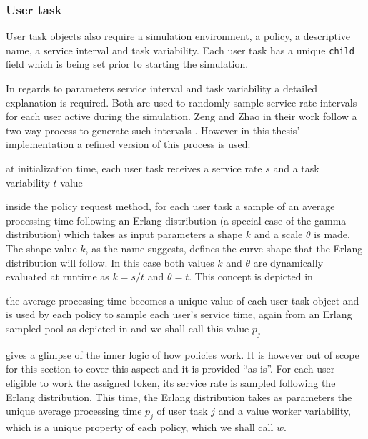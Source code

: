 \documentclass{seal_thesis}
\begin{document}
\subsubsection{User task}
\label{subsec:user_task}

User task objects also require a simulation environment, a policy, a descriptive name, a service interval and task variability. Each user task has a unique \texttt{child} field which is being set prior to starting the simulation.

In regards to parameters service interval and task variability a detailed explanation is required. Both are used to randomly sample service rate intervals for each user active during the simulation. Zeng and Zhao in their work follow a two way process to generate such intervals \cite[p. 8]{Zeng2005}. However in this thesis' implementation a refined version of this process is used:
\begin{enumerate*}
	\item at initialization time, each user task receives a service rate $s$ and a task variability $t$ value
	\item inside the policy request method, for each user task a sample of an average processing time following an Erlang distribution (a special case of the gamma distribution) which takes as input parameters a shape $k$ and a scale $\theta$ is made. The shape value $k$, as the name suggests, defines the curve shape that the Erlang distribution will follow. In this case both values $k$ and $\theta$ are dynamically evaluated at runtime as $k=s/t$ and $\theta = t$. This concept is depicted in 
	\item the average processing time becomes a unique value of each user task object and is used by each policy to sample each user's service time, again from an Erlang sampled pool as depicted in  and we shall call this value $p_j$
\end{enumerate*}

 gives a glimpse of the inner logic of how policies work. It is however out of scope for this section to cover this aspect and it is provided ``as is''. For each user eligible to work the assigned token, its service rate is sampled following the Erlang distribution. This time, the Erlang distribution takes as parameters the unique average processing time $p_j$ of user task $j$ and a value worker variability, which is a unique property of each policy, which we shall call $w$.
\end{document}
